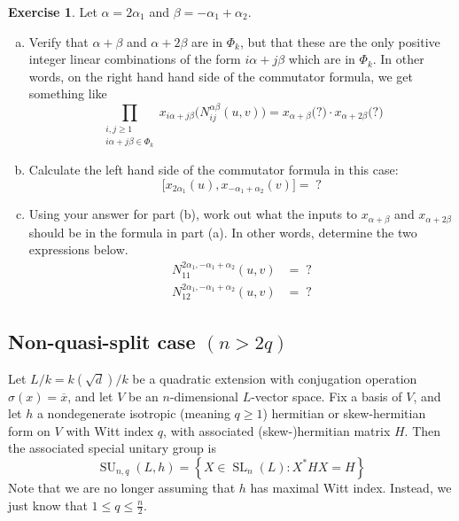 \documentclass[12pt]{article}
\theoremstyle{definition}
\newtheorem{exercise}[theorem]{Exercise}
\newcommand{\sig}{\sigma}
\newcommand{\lb}{\left\{}
\newcommand{\rb}{\right\}}
\newcommand{\noi}{\noindent}
\newcommand{\ov}{\overline}
\DeclareMathOperator{\SL}{SL}
\DeclareMathOperator{\SU}{SU}
\begin{document}
\begin{exercise}
Let $\alpha = 2\alpha_1$ and $\beta = - \alpha_1 + \alpha_2$.
\begin{enumerate}[(a)]
	\item Verify that $\alpha + \beta$ and $\alpha + 2\beta$ are in $\Phi_k$, but that these are the only positive integer linear combinations of the form $i\alpha + j\beta$ which are in $\Phi_k$. In other words, on the right hand hand side of the commutator formula, we get something like
	\[
		\prod_{\substack{{i,j \ge 1} \\ i\alpha+j\beta \in \Phi_k}} x_{i\alpha+j\beta} \Big( N_{ij}^{\alpha \beta}(u,v) \Big) = x_{\alpha+\beta} \Big( ? \Big) \cdot x_{\alpha + 2\beta} \Big( ?\Big)
	\]
	\item Calculate the left hand side of the commutator formula in this case:
	\[
		\Big[ x_{2\alpha_1}(u), x_{-\alpha_1 + \alpha_2}(v) \Big] = \; ?
	\]
	\item Using your answer for part (b), work out what the inputs to $x_{\alpha+\beta}$ and $x_{\alpha+2\beta}$ should be in the formula in part (a). In other words, determine the two expressions below.
	\begin{align*}
		N_{11}^{2\alpha_1, - \alpha_1 + \alpha_2}(u,v) &= \; ? \\
		N_{12}^{2\alpha_1, - \alpha_1 + \alpha_2}(u,v) &= \; ?
	\end{align*}
\end{enumerate}
\end{exercise}

\subsection{Non-quasi-split case $(n>2q)$}

\noi Let $L/k = k(\sqrt{d})/k$ be a quadratic extension with conjugation operation $\sig(x) = \ov x$, and let $V$ be an $n$-dimensional $L$-vector space. Fix a basis of $V$, and let $h$ a nondegenerate isotropic (meaning $q \ge 1$) hermitian or skew-hermitian form on $V$ with Witt index $q$, with associated (skew-)hermitian matrix $H$. Then the associated special unitary group is
\[
	\SU_{n,q}(L,h) = \lb X \in \SL_{n}(L) : X^*HX = H \rb
\]
Note that we are no longer assuming that $h$ has maximal Witt index. Instead, we just know that $1 \le q \le \frac{n}{2}$. 
\end{document}

